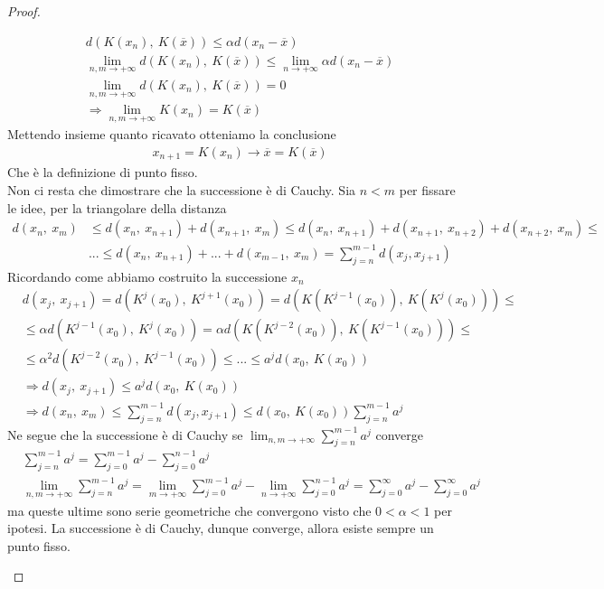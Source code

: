 \documentclass[10pt,a4paper]{article}
\newtheorem{proof}{Proof}
\begin{document}
\begin{proof}
\begin{enumerate}
		\begin{align*}
			&d(K(x_n),\ K(\overline{x}))\leq \alpha d(x_n-\overline{x}) \\
			&\lim_{n,m\to+\infty} d(K(x_n),\ K(\overline{x})) \leq\lim_{n\to +\infty}\alpha d(x_n-\overline{x})\\
			&\lim_{n,m\to+\infty} d(K(x_n),\ K(\overline{x})) = 0\\
			&\Rightarrow \lim_{n,m\to+\infty} K(x_n) =  K(\overline{x})
		\end{align*}
		Mettendo insieme quanto ricavato otteniamo la conclusione
		\begin{align*}
			&x_{n+1} = K(x_n)\to \overline{x}=K(\overline{x})
		\end{align*}
		Che è la definizione di punto fisso.\\
		Non ci resta che dimostrare che la successione è di Cauchy. Sia \(n<m\) per fissare le idee, per la triangolare della distanza
		\begin{align*}
			d(x_n,\ x_m)&\leq d(x_n,\ x_{n+1})+d(x_{n+1},\ x_m)\leq d(x_n,\ x_{n+1})+d(x_{n+1},\ x_{n+2})+d(x_{n+2},\ x_m)\leq\\
			&...\leq d(x_n,\ x_{n+1})+...+d(x_{m-1},\ x_{m})=\sum_{j=n}^{m-1}d(x_j, x_{j+1})
		\end{align*}
		Ricordando come abbiamo costruito la successione \(x_n\)
		\begin{align*}
			&d(x_j,\ x_{j+1})=d(K^j(x_0),\ K^{j+1}(x_0)) = d(K(K^{j-1}(x_0)),\ K(K^{j}(x_0)))\leq\\
			&\leq \alpha d(K^{j-1}(x_0),\ K^{j}(x_0)) = \alpha d(K(K^{j-2}(x_0)),\ K(K^{j-1}(x_0)))\leq\\
			&\leq \alpha^2 d(K^{j-2}(x_0),\ K^{j-1}(x_0))\leq...\leq a^jd(x_0,\ K(x_0))\\
			&\Rightarrow d(x_j,\ x_{j+1})\leq a^j d(x_0,\ K(x_0))\\
			&\Rightarrow d(x_n,\ x_m)\leq \sum_{j=n}^{m-1}d(x_j, x_{j+1})\leq d(x_0,\ K(x_0))\sum_{j=n}^{m-1} a^j
		\end{align*}
		Ne segue che la successione è di Cauchy se \(\lim_{n,m\to+\infty} \sum_{j=n}^{m-1} a^j\) converge
		\begin{align*}
			&\sum_{j=n}^{m-1} a^j = \sum_{j=0}^{m-1} a^j - \sum_{j=0}^{n-1} a^j \\
			&\lim_{n,m\to+\infty} \sum_{j=n}^{m-1} a^j= \lim_{m\to+\infty}\sum_{j=0}^{m-1} a^j -  \lim_{n\to+\infty}\sum_{j=0}^{n-1} a^j = \sum_{j=0}^{\infty} a^j - \sum_{j=0}^{\infty} a^j
		\end{align*}
		ma queste ultime sono serie geometriche che convergono visto che $0<\alpha<1$ per ipotesi. La successione è di Cauchy, dunque converge, allora esiste sempre un punto fisso. 
	\end{enumerate}
\end{proof}
\end{document}
